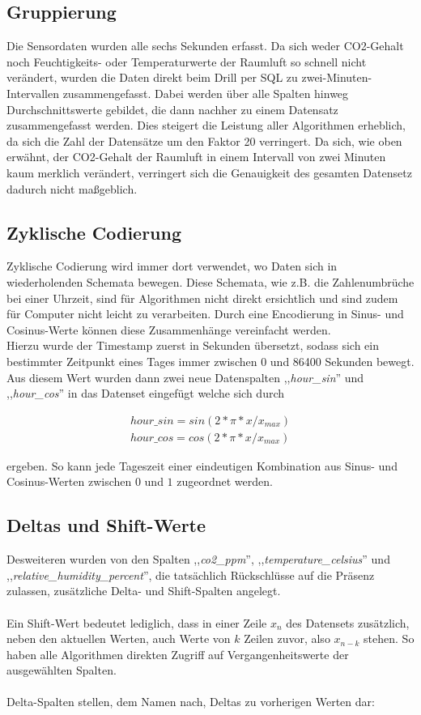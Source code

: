\subsection{Gruppierung}
Die Sensordaten wurden alle sechs Sekunden erfasst. Da sich weder CO2-Gehalt noch Feuchtigkeits- oder 
Temperaturwerte der Raumluft so schnell nicht verändert, wurden die Daten direkt beim Drill per SQL zu 
zwei-Minuten-Intervallen zusammengefasst. Dabei werden über alle Spalten hinweg Durchschnittswerte gebildet, 
die dann nachher zu einem Datensatz zusammengefasst werden. 
Dies steigert die Leistung aller Algorithmen erheblich, da sich die Zahl der 
Datensätze um den Faktor 20 verringert. Da sich, wie oben erwähnt, der CO2-Gehalt der Raumluft in einem 
Intervall von zwei Minuten kaum merklich verändert, verringert sich die Genauigkeit des gesamten Datensetz 
dadurch nicht maßgeblich.
\subsection{Zyklische Codierung}
Zyklische Codierung wird immer dort verwendet, wo Daten sich in wiederholenden Schemata bewegen. Diese 
Schemata, wie z.B. die Zahlenumbrüche bei einer Uhrzeit, sind für Algorithmen nicht direkt ersichtlich und 
sind zudem für Computer nicht leicht zu verarbeiten. Durch eine Encodierung in 
Sinus- und Cosinus-Werte können diese Zusammenhänge vereinfacht werden.\\
Hierzu wurde der Timestamp zuerst in Sekunden übersetzt, sodass sich ein bestimmter Zeitpunkt eines Tages 
immer zwischen 0 und 86400 Sekunden bewegt.
Aus diesem Wert wurden dann zwei neue Datenspalten ,,\textit{hour\_sin}'' und ,,\textit{hour\_cos}'' 
in das Datenset eingefügt welche sich durch 

\begin{align}
    hour\_sin = sin(2 * \pi * x / x_{max}) \\ 
    hour\_cos = cos(2 * \pi * x / x_{max})
\end{align} 

ergeben. So kann jede Tageszeit einer eindeutigen Kombination aus Sinus- und Cosinus-Werten zwischen 
$0$ und $1$ zugeordnet werden.

\subsection{Deltas und Shift-Werte}
Desweiteren wurden von den Spalten ,,\textit{co2\_ppm}'', ,,\textit{temperature\_celsius}'' und \break 
,,\textit{relative\_humidity\_percent}'', die tatsächlich Rückschlüsse auf die Präsenz zulassen, \break 
zusätzliche Delta- und Shift-Spalten angelegt.\\\\
Ein Shift-Wert bedeutet lediglich, dass  in einer Zeile $x_n$ des Datensets 
zusätzlich, neben den aktuellen Werten, auch Werte von $k$ Zeilen zuvor, also $x_{n-k}$ stehen. So haben 
alle Algorithmen direkten Zugriff auf Vergangenheitswerte der ausgewählten Spalten.\\\\
Delta-Spalten stellen, dem Namen nach, Deltas zu vorherigen Werten dar:

